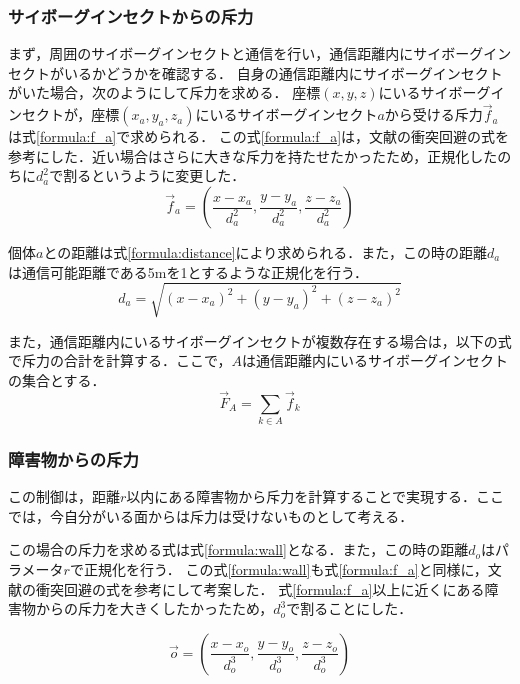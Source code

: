 \documentclass[a4paper,11pt]{jarticle}
\begin{document}
	\subsubsection{サイボーグインセクトからの斥力}
	\label{sec:repulsive_insect}
	まず，周囲のサイボーグインセクトと通信を行い，通信距離内にサイボーグインセクトがいるかどうかを確認する．
	自身の通信距離内にサイボーグインセクトがいた場合，次のようにして斥力を求める．
	座標$(x,y,z)$にいるサイボーグインセクトが，座標$(x_a,y_a,z_a)$にいるサイボーグインセクト$a$から受ける斥力$\vec{f}_a$は式\ref{formula:f_a}で求められる．
	この式\ref{formula:f_a}は，文献\cite{steering}の衝突回避の式を参考にした．近い場合はさらに大きな斥力を持たせたかったため，正規化したのちに$d_a^2$で割るというように変更した．
	\begin{equation}
	\label{formula:f_a}
	\vec{f}_a = (\frac{x - x_a}{d_a^2},\frac{y- y_a}{d_a^2},\frac{z - z_a}{d_a^2})
	\end{equation}
	
	個体$a$との距離は式\ref{formula:distance}により求められる．また，この時の距離$d_a$は通信可能距離である5mを1とするような正規化を行う．
	\begin{equation}
	\label{formula:distance}
	d_a = \sqrt{(x-x_a)^2+(y-y_a)^2+(z-z_a)^2}
	\end{equation}
	
	また，通信距離内にいるサイボーグインセクトが複数存在する場合は，以下の式で斥力の合計を計算する．ここで，$A$は通信距離内にいるサイボーグインセクトの集合とする．
	\begin{equation}
	\vec{F}_A =　\sum_{k \in A}\vec{f}_k
	\label{formula:repalsive}
	\end{equation}
	
	\subsubsection{障害物からの斥力}
	\label{sec:repulsive_object}
	この制御は，距離$r$以内にある障害物から斥力を計算することで実現する．ここでは，今自分がいる面からは斥力は受けないものとして考える．
	
	この場合の斥力を求める式は式\ref{formula:wall}となる．また，この時の距離$d_o$はパラメータ$r$で正規化を行う．
	この式\ref{formula:wall}も式\ref{formula:f_a}と同様に，文献\cite{steering}の衝突回避の式を参考にして考案した．
	式\ref{formula:f_a}以上に近くにある障害物からの斥力を大きくしたかったため，$d_o^3$で割ることにした．
	
	\begin{equation}
	\vec{o} =  (\frac{x - x_o}{d_o^3},\frac{y- y_o}{d_o^3},\frac{z - z_o}{d_o^3})
	\label{formula:wall}
	\end{equation}
	
\end{document}
